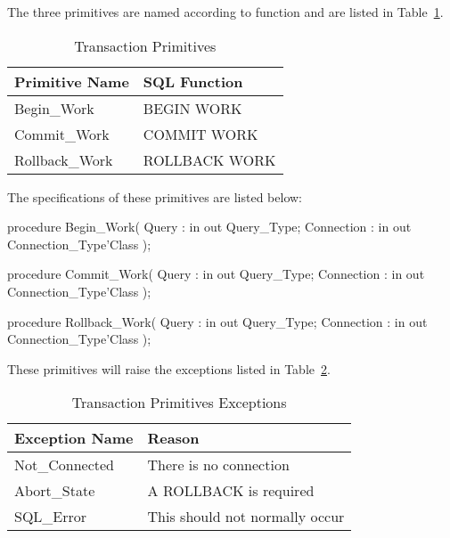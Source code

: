 \documentclass[english,letterpaper]{book}
\begin{document}
The three primitives are named according to function \label{Begin, Commit and Rollback Work functions}
and are listed in Table~\ref{t:txp}.

\begin{table}
   \begin{center}
      \begin{tabular}{ll}
         Primitive Name    &  SQL Function\\
         \hline 
         Begin\_Work       &  BEGIN WORK\\
         Commit\_Work      &  COMMIT WORK\\
         Rollback\_Work    &  ROLLBACK WORK\\
      \end{tabular}
   \end{center}
   \caption{Transaction Primitives}\label{t:txp}
\end{table}

The specifications of these primitives are listed below:

\begin{Code}
procedure Begin_Work(
   Query :      in out Query_Type;
   Connection : in out Connection_Type'Class
);
\end{Code}

\begin{Code}
procedure Commit_Work(
   Query :      in out Query_Type;
   Connection : in out Connection_Type'Class
);
\end{Code}

\begin{Code}
procedure Rollback_Work(
   Query :      in out Query_Type;
   Connection : in out Connection_Type'Class
);
\end{Code}

These primitives will raise the exceptions listed in Table~\ref{t:tranpx}.

\begin{table}
   \begin{center}
      \begin{tabular}{ll}
         Exception Name    &  Reason\\
         \hline 
         Not\_Connected    &  There is no connection\\
         Abort\_State      &  A ROLLBACK is required\\
         SQL\_Error        &  This should not normally occur\\
      \end{tabular}
   \end{center}
   \caption{Transaction Primitives Exceptions}\label{t:tranpx}
\end{table}
\end{document}
